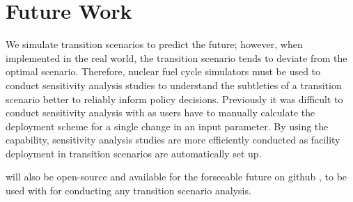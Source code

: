 \section{Future Work}
We simulate transition scenarios to predict the future; 
however, when implemented in the real world, the transition 
scenario tends to deviate from the optimal scenario.
Therefore, nuclear fuel cycle simulators must be used to conduct
sensitivity analysis studies to understand the subtleties of 
a transition scenario better to reliably inform policy decisions.
Previously it was difficult to conduct sensitivity analysis with \Cyclus 
as users have to manually calculate the deployment scheme for a 
single change in an input parameter. 
By using the \deploy capability,
sensitivity analysis studies are more efficiently 
conducted as facility deployment in transition scenarios 
are automatically set up. 

\deploy will also be open-source and available for the forseeable future on github 
\cite{noauthor_arfc/d3ploy:_2019}, to be used with \Cyclus for conducting any 
transition scenario analysis. 
